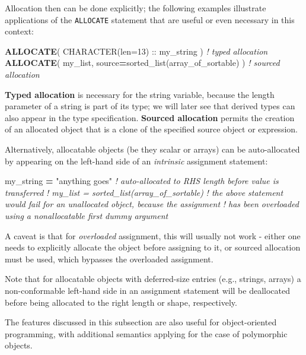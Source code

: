 \documentclass[
]{scrartcl}
\newenvironment{Shaded}{}{}
\newcommand{\CommentTok}[1]{\textcolor[rgb]{0.38,0.63,0.69}{\textit{#1}}}
\newcommand{\DataTypeTok}[1]{\textcolor[rgb]{0.56,0.13,0.00}{#1}}
\newcommand{\KeywordTok}[1]{\textcolor[rgb]{0.00,0.44,0.13}{\textbf{#1}}}
\newcommand{\NormalTok}[1]{#1}
\newcommand{\StringTok}[1]{\textcolor[rgb]{0.25,0.44,0.63}{#1}}
\begin{document}
Allocation then can be done explicitly; the following examples
illustrate applications of the \texttt{ALLOCATE} statement that are
useful or even necessary in this context:

\begin{Shaded}
\begin{Highlighting}[]
\KeywordTok{ALLOCATE}\NormalTok{( }\DataTypeTok{CHARACTER(len=13)} \DataTypeTok{::}\NormalTok{ my\_string )                  }\CommentTok{! typed allocation}
\KeywordTok{ALLOCATE}\NormalTok{( my\_list, source}\KeywordTok{=}\NormalTok{sorted\_list(array\_of\_sortable) )  }\CommentTok{! sourced allocation}
\end{Highlighting}
\end{Shaded}

\textbf{Typed allocation} is necessary for the string variable, because
the length parameter of a string is part of its type; we will later see
that derived types can also appear in the type specification.
\textbf{Sourced allocation} permits the creation of an allocated object
that is a clone of the specified source object or expression.

Alternatively, allocatable objects (be they scalar or arrays) can be
auto-allocated by appearing on the left-hand side of an \emph{intrinsic}
assignment statement:

\begin{Shaded}
\begin{Highlighting}[]
\NormalTok{my\_string }\KeywordTok{=} \StringTok{"anything goes"}  \CommentTok{! auto{-}allocated to RHS length before value is transferred}
\CommentTok{! my\_list = sorted\_list(array\_of\_sortable)}
\CommentTok{! the above statement would fail for an unallocated object, because the assignment}
\CommentTok{! has been overloaded using a nonallocatable first dummy argument}
\end{Highlighting}
\end{Shaded}

A caveat is that for \emph{overloaded} assignment, this will usually not
work - either one needs to explicitly allocate the object before
assigning to it, or sourced allocation must be used, which bypasses the
overloaded assignment.

Note that for allocatable objects with deferred-size entries (e.g.,
strings, arrays) a non-conformable left-hand side in an assignment
statement will be deallocated before being allocated to the right length
or shape, respectively.

The features discussed in this subsection are also useful for
object-oriented programming, with additional semantics applying for the
case of polymorphic objects.
\end{document}
